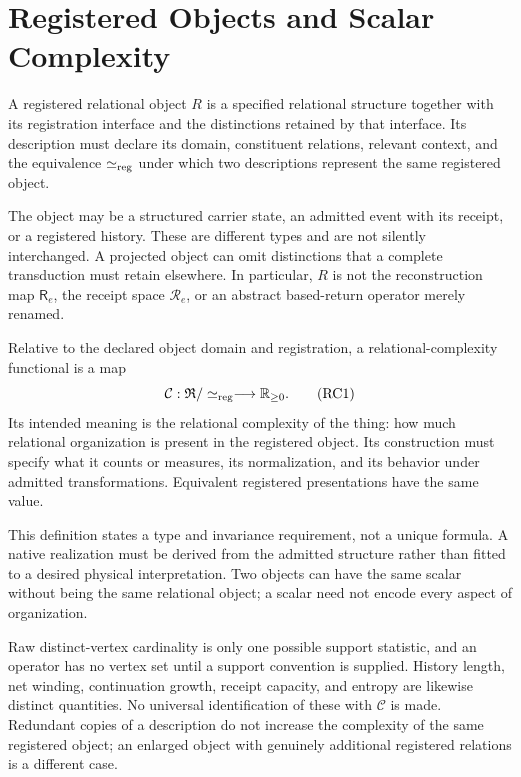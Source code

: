 \begingroup
\renewcommand{\thesection}{4A}
\section{Registered Objects and Scalar Complexity}\label{sec:complexity}
\begin{definition}
A registered relational object $R$ is a specified relational structure together with its registration interface and the distinctions retained by that interface. Its description must declare its domain, constituent relations, relevant context, and the equivalence $\simeq_{\rm reg}$ under which two descriptions represent the same registered object.
\end{definition}
The object may be a structured carrier state, an admitted event with its receipt, or a registered history. These are different types and are not silently interchanged. A projected object can omit distinctions that a complete transduction must retain elsewhere. In particular, $R$ is not the reconstruction map $\mathsf R_e$, the receipt space $\mathcal R_e$, or an abstract based-return operator merely renamed.

\begin{definition}
Relative to the declared object domain and registration, a relational-complexity functional is a map
\begin{equation}
\mathcal C:\mathfrak R/\simeq_{\rm reg}\longrightarrow\mathbb R_{\geq0}.
\tag{RC1}\label{eq:complexitydomain}
\end{equation}
Its intended meaning is the relational complexity of the thing: how much relational organization is present in the registered object. Its construction must specify what it counts or measures, its normalization, and its behavior under admitted transformations. Equivalent registered presentations have the same value.
\end{definition}
This definition states a type and invariance requirement, not a unique formula. A native realization must be derived from the admitted structure rather than fitted to a desired physical interpretation. Two objects can have the same scalar without being the same relational object; a scalar need not encode every aspect of organization.

Raw distinct-vertex cardinality is only one possible support statistic, and an operator has no vertex set until a support convention is supplied. History length, net winding, continuation growth, receipt capacity, and entropy are likewise distinct quantities. No universal identification of these with $\mathcal C$ is made. Redundant copies of a description do not increase the complexity of the same registered object; an enlarged object with genuinely additional registered relations is a different case.

